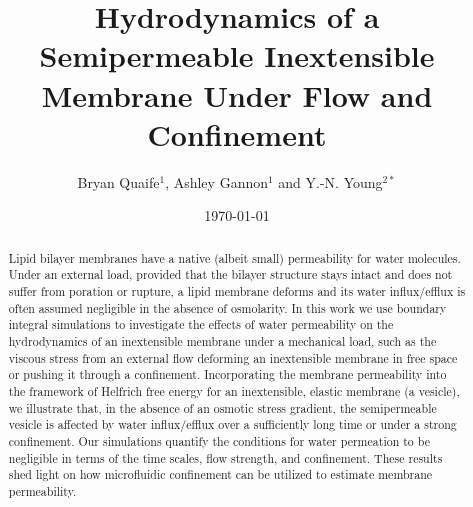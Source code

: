 \documentclass[prb,preprint,showpacs,preprintnumbers,amsmath,amssymb,longbibliography]{revtex4-1}
\begin{document}
\title{Hydrodynamics of a  Semipermeable Inextensible Membrane Under Flow and
Confinement}

\author{Bryan Quaife$^{1}$, Ashley Gannon$^{1}$ and Y.-N. Young$^{2*}$}

\date{\today}


\begin{abstract}
Lipid bilayer membranes have a native (albeit small) permeability for
water molecules. Under an external load, 
provided that the bilayer structure stays intact and does
not suffer from poration or rupture,
a lipid membrane deforms and
its water influx/efflux is often assumed negligible in the absence of
osmolarity. 
%
In this work we use boundary integral simulations to investigate the
effects of water permeability on the hydrodynamics of an inextensible membrane under
a mechanical load, such as the viscous stress from an external flow
deforming an inextensible membrane in free space or pushing it through a
confinement. Incorporating the membrane permeability into the framework of Helfrich free energy for an inextensible, elastic membrane (a vesicle), we
illustrate that, in the absence of an osmotic stress gradient, the
semipermeable vesicle is affected by water influx/efflux over a
sufficiently long time or under a strong confinement. Our simulations
quantify the conditions for water permeation to be negligible in terms
of the time scales, flow strength, and confinement. These results shed
light on how microfluidic confinement can be utilized to estimate
membrane permeability.
\end{abstract}

                              
                              
\maketitle
\end{document}

